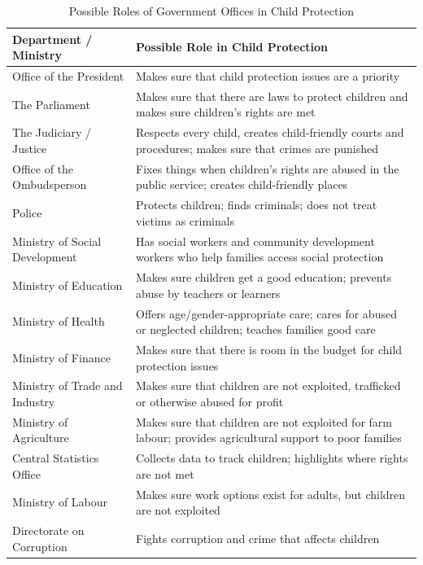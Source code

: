 \documentclass[12pt,a4paper]{article}
\begin{document}
\begin{table}[h!]
    \centering
    \caption{Possible Roles of Government Offices in Child Protection}
    \begin{tabular}{|p{4.5cm}|p{8.5cm}|}
        \hline
        \textbf{Department / Ministry} & \textbf{Possible Role in Child Protection} \\ \hline
        Office of the President & Makes sure that child protection issues are a priority \\ \hline
        The Parliament & Makes sure that there are laws to protect children and makes sure children’s rights are met \\ \hline
        The Judiciary / Justice & Respects every child, creates child-friendly courts and procedures; makes sure that crimes are punished \\ \hline
        Office of the Ombudsperson & Fixes things when children’s rights are abused in the public service; creates child-friendly places \\ \hline
        Police & Protects children; finds criminals; does not treat victims as criminals \\ \hline
        Ministry of Social Development & Has social workers and community development workers who help families access social protection \\ \hline
        Ministry of Education & Makes sure children get a good education; prevents abuse by teachers or learners \\ \hline
        Ministry of Health & Offers age/gender-appropriate care; cares for abused or neglected children; teaches families good care \\ \hline
        Ministry of Finance & Makes sure that there is room in the budget for child protection issues \\ \hline
        Ministry of Trade and Industry & Makes sure that children are not exploited, trafficked or otherwise abused for profit \\ \hline
        Ministry of Agriculture & Makes sure that children are not exploited for farm labour; provides agricultural support to poor families \\ \hline
        Central Statistics Office & Collects data to track children; highlights where rights are not met \\ \hline
        Ministry of Labour & Makes sure work options exist for adults, but children are not exploited \\ \hline
        Directorate on Corruption & Fights corruption and crime that affects children \\ \hline

\end{tabular}
\end{table}
\end{document}
